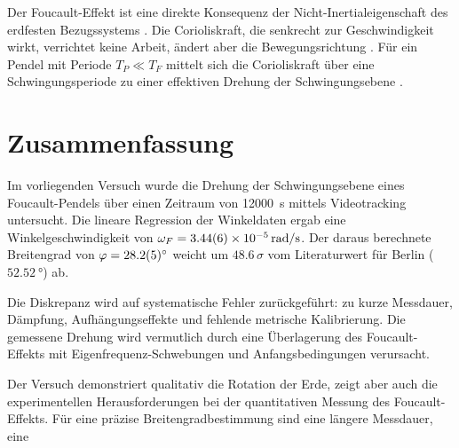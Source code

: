 \documentclass[a4paper,12pt]{article}
\begin{document}
Der Foucault-Effekt ist eine direkte Konsequenz der Nicht-Inertialeigenschaft des erdfesten Bezugssystems \cite[S.~154]{nolting2023}. Die Corioliskraft, die senkrecht zur Geschwindigkeit wirkt, verrichtet keine Arbeit, ändert aber die Bewegungsrichtung \cite[S.~155]{nolting2023}. Für ein Pendel mit Periode $T_P \ll T_F$ mittelt sich die Corioliskraft über eine Schwingungsperiode zu einer effektiven Drehung der Schwingungsebene \cite[S.~157]{nolting2023}.

\section{Zusammenfassung}

Im vorliegenden Versuch wurde die Drehung der Schwingungsebene eines Foucault-Pendels über einen Zeitraum von \qty{12000}{s} mittels Videotracking untersucht. Die lineare Regression der Winkeldaten ergab eine Winkelgeschwindigkeit von $\omega_F = \qty{3.44 +- 0.06 e-5}{rad/s}$. Der daraus berechnete Breitengrad von $\varphi = \qty{28.2 +- 0.5}{\degree}$ weicht um $\num{48.6}\,\sigma$ vom Literaturwert für Berlin ($\qty{52.52}{\degree}$) ab.

Die Diskrepanz wird auf systematische Fehler zurückgeführt: zu kurze Messdauer, Dämpfung, Aufhängungseffekte und fehlende metrische Kalibrierung. Die gemessene Drehung wird vermutlich durch eine Überlagerung des Foucault-Effekts mit Eigenfrequenz-Schwebungen und Anfangsbedingungen verursacht.

Der Versuch demonstriert qualitativ die Rotation der Erde, zeigt aber auch die experimentellen Herausforderungen bei der quantitativen Messung des Foucault-Effekts. Für eine präzise Breitengradbestimmung sind eine längere Messdauer, eine
\end{document}
